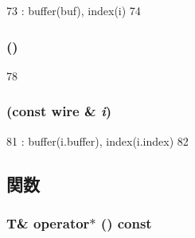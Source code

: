 \begin{DoxyCode}
73             : buffer(buf), index(i)
74         { }
\end{DoxyCode}
\hypertarget{classTimeBuffer_1_1wire_aee5e970f3a165458d46430f828e9d2c2}{
\subsubsection[{wire}]{ ()}}
\label{classTimeBuffer_1_1wire_aee5e970f3a165458d46430f828e9d2c2}



\begin{DoxyCode}
78         { }
\end{DoxyCode}
\hypertarget{classTimeBuffer_1_1wire_a6a20c12d3bf89170b87215cf247b21dc}{
\subsubsection[{wire}]{ (const {\bf wire} \& {\em i})}}
\label{classTimeBuffer_1_1wire_a6a20c12d3bf89170b87215cf247b21dc}



\begin{DoxyCode}
81             : buffer(i.buffer), index(i.index)
82         { }
\end{DoxyCode}


\subsection{関数}
\hypertarget{classTimeBuffer_1_1wire_abcc36ef133f26e7e3145b785df23eb18}{
\subsubsection[{operator$\ast$}]{\setlength{\rightskip}{0pt plus 5cm}T\& operator$\ast$ () const}}
\label{classTimeBuffer_1_1wire_abcc36ef133f26e7e3145b785df23eb18}



